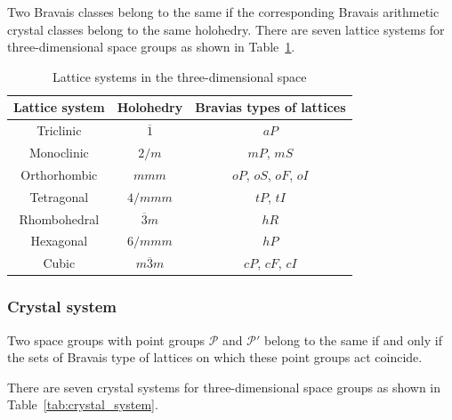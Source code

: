 Two Bravais classes belong to the same  if the corresponding Bravais arithmetic crystal classes belong to the same holohedry.
There are seven lattice systems for three-dimensional space groups as shown in Table~\ref{tab:lattice_system}.

\begin{table}[htb]
  \centering
  \caption{Lattice systems in the three-dimensional space}
  \label{tab:lattice_system}
  \begin{tabular}[h]{ccc}
    \hline\hline
    Lattice system & Holohedry & Bravias types of lattices \\ \hline
    Triclinic    & $\overline{1}$   & $aP$                   \\
    Monoclinic   & $2/m$            & $mP$, $mS$             \\
    Orthorhombic & $mmm$            & $oP$, $oS$, $oF$, $oI$ \\
    Tetragonal   & $4/mmm$          & $tP$, $tI$             \\
    Rhombohedral & $\overline{3}m$  & $hR$                   \\
    Hexagonal    & $6/mmm$          & $hP$                   \\
    Cubic        & $m\overline{3}m$ & $cP$, $cF$, $cI$       \\
    \hline\hline
  \end{tabular}
\end{table}

\subsubsection{\label{sec:crystal-system}Crystal system}

\begin{screen}
  \begin{defn}
    Two space groups with point groups $\mathcal{P}$ and $\mathcal{P}'$ belong to the same  if and only if the sets of Bravais type of lattices on which these point groups act coincide.
  \end{defn}
\end{screen}

There are seven crystal systems for three-dimensional space groups as shown in Table~\ref{tab:crystal_system}.

